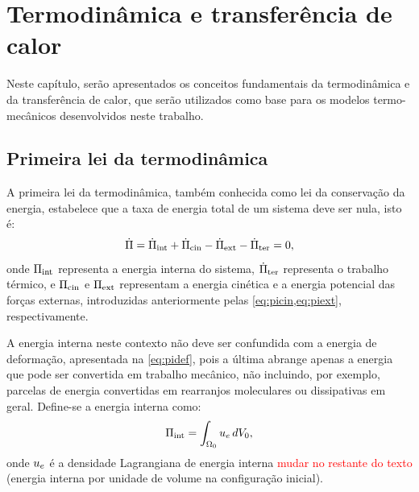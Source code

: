 \documentclass[Tese.tex]{subfiles}
\begin{document}
	
\chapter{Termodinâmica e transferência de calor}\label{ch:termodinamica}

Neste capítulo, serão apresentados os conceitos fundamentais da termodinâmica e da transferência de calor, que serão utilizados como base para os modelos termo-mecânicos desenvolvidos neste trabalho.

\section{Primeira lei da termodinâmica}

A primeira lei da termodinâmica, também conhecida como lei da conservação da energia, estabelece que a taxa de energia total de um sistema deve ser nula, isto é:
\begin{equation}\label{eq:1lei}
\dot{\Pi} = \dot{\Pi}_\text{int} + \dot{\Pi}_\text{cin} - \dot{\Pi}_\text{ext} - \dot{\Pi}_\text{ter} = 0 ,
\end{equation}	
onde $\Pi_\text{int}$ representa a energia interna do sistema, $\dot{\Pi}_\text{ter}$ representa o trabalho térmico, e $\Pi_\text{cin}$ e $\Pi_\text{ext}$ representam a energia cinética e a energia potencial das forças externas, introduzidas anteriormente pelas \cref{eq:picin,eq:piext}, respectivamente.

A energia interna neste contexto não deve ser confundida com a energia de deformação, apresentada na \cref{eq:pidef}, pois a última abrange apenas a energia que pode ser convertida em trabalho mecânico, não incluindo, por exemplo, parcelas de energia convertidas em rearranjos moleculares ou dissipativas em geral. Define-se a energia interna como:
\begin{equation}\label{eq:piint}
\Pi_\text{int} = \int_{\Omega_0}u_e\,dV_0,
\end{equation}
onde $u_e$ é a densidade Lagrangiana de energia interna \textcolor{red}{mudar no restante do texto} (energia interna por unidade de volume na configuração inicial). 

\end{document}
